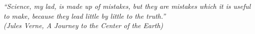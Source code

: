 \begin{epigrafe}
    \vspace*{\fill}
	\begin{flushright}

		\textit{“Science, my lad, is made up of mistakes, but they are mistakes which it is useful to make, because they lead little by little to the truth.”\\
		(Jules Verne, A Journey to the Center of the Earth)}
	\end{flushright}
\end{epigrafe}
